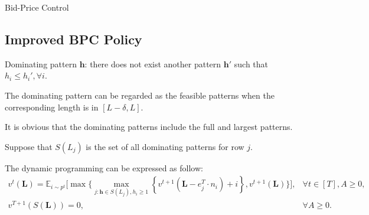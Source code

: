 \begin{algorithm}[H]
    \caption{Bid-Price Control}\label{algo_bid}
\end{algorithm}






\subsection{Improved BPC Policy}
Dominating pattern $\bm{h}$: there does not exist another pattern $\bm{h{'}}$ such that $h_{i} \leq h_{i}{'}, \forall i$.

The dominating pattern can be regarded as the feasible patterns when the corresponding length is in $[L-\delta, L]$.

It is obvious that the dominating patterns include the full and largest patterns.

Suppose that $S(L_{j})$ is the set of all dominating patterns for row $j$.

The dynamic programming can be expressed as follow:
\begin{equation}
    \begin{array}{lr}
    v^t(\bm{L})=\mathbb{E}_{i \sim p^t}\Bigg[\max\Big\{\max_{j :\bm{h} \in S(L_{j}), 
    h_{i} \geqslant 1}\left\{v^{t+1}(\bm{L}- e_{j}^{T} \cdot n_{i})+ {i}\right\}, v^{t+1}(\bm{L})\Big\}\Bigg], & \forall t \in[T], A \geqslant 0, \\
    v^{T+1}(S(\bm{L}))=0, & \forall A \geqslant 0.
    \end{array}
\end{equation}

